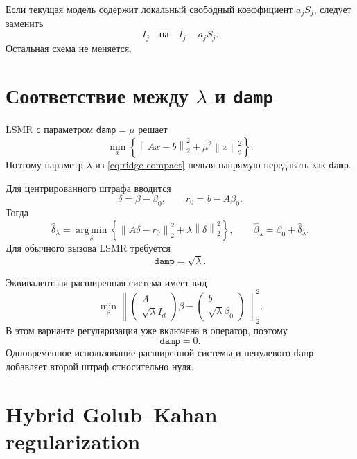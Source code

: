 \documentclass[11pt,a4paper]{article}
\newcommand{\norm}[1]{\left\lVert #1\right\rVert_2}
\newcommand{\argmin}{\operatorname*{arg\,min}}
\begin{document}
Если текущая модель содержит локальный свободный коэффициент \(a_jS_j\), следует заменить
\[
    I_j
    \quad\text{на}\quad
    I_j-a_jS_j.
\]
Остальная схема не меняется.

\section{Соответствие между \(\lambda\) и \texttt{damp}}

LSMR с параметром \texttt{damp}\(=\mu\) решает
\begin{equation}
\label{eq:lsmr-damp}
    \min_x
    \left\{
        \norm{Ax-b}^{2}
        +
        \mu^2\norm{x}^{2}
    \right\}.
\end{equation}
Поэтому параметр \(\lambda\) из \eqref{eq:ridge-compact} нельзя напрямую передавать как
\texttt{damp}.

Для центрированного штрафа вводится
\[
    \delta=\beta-\beta_0,
    \qquad
    r_0=b-A\beta_0.
\]
Тогда
\begin{equation}
\label{eq:shifted}
    \widehat\delta_\lambda
    =
    \argmin_{\delta}
    \left\{
        \norm{A\delta-r_0}^{2}
        +
        \lambda\norm{\delta}^{2}
    \right\},
    \qquad
    \widehat\beta_\lambda=\beta_0+\widehat\delta_\lambda.
\end{equation}
Для обычного вызова LSMR требуется
\begin{equation}
\boxed{
    \texttt{damp}=\sqrt{\lambda}.
}
\end{equation}

Эквивалентная расширенная система имеет вид
\[
    \min_{\beta}
    \left\|
    \begin{pmatrix}
        A\\
        \sqrt{\lambda}I_d
    \end{pmatrix}\beta
    -
    \begin{pmatrix}
        b\\
        \sqrt{\lambda}\beta_0
    \end{pmatrix}
    \right\|_2^2.
\]
В этом варианте регуляризация уже включена в оператор, поэтому
\begin{equation}
\boxed{
    \texttt{damp}=0.
}
\end{equation}
Одновременное использование расширенной системы и ненулевого \texttt{damp}
добавляет второй штраф относительно нуля.

\section{Hybrid Golub--Kahan regularization}
\end{document}
